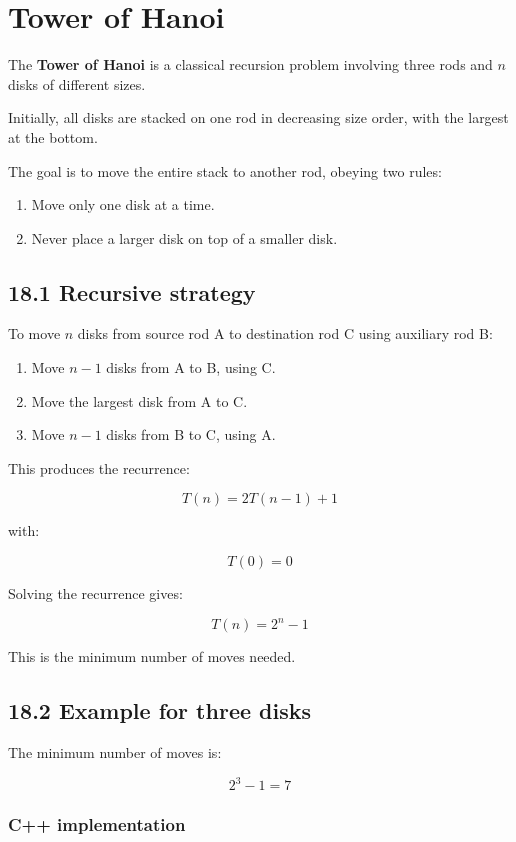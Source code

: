 \section{Tower of Hanoi}

The \textbf{Tower of Hanoi} is a classical recursion problem involving three rods and $n$ disks of different sizes.

Initially, all disks are stacked on one rod in decreasing size order, with the largest at the bottom.

The goal is to move the entire stack to another rod, obeying two rules:

\begin{enumerate}
    \item Move only one disk at a time.
    \item Never place a larger disk on top of a smaller disk.
\end{enumerate}

\subsection{18.1 Recursive strategy}

To move $n$ disks from source rod A to destination rod C using auxiliary rod B:

\begin{enumerate}
    \item Move $n-1$ disks from A to B, using C.
    \item Move the largest disk from A to C.
    \item Move $n-1$ disks from B to C, using A.
\end{enumerate}

This produces the recurrence:


\[
\boxed{T(n)=2T(n-1)+1}
\]


with:


\[
T(0)=0
\]


Solving the recurrence gives:


\[
\boxed{T(n)=2^n-1}
\]


This is the minimum number of moves needed.

\subsection{18.2 Example for three disks}

The minimum number of moves is:


\[
2^3-1=7
\]


\subsubsection{C++ implementation}

